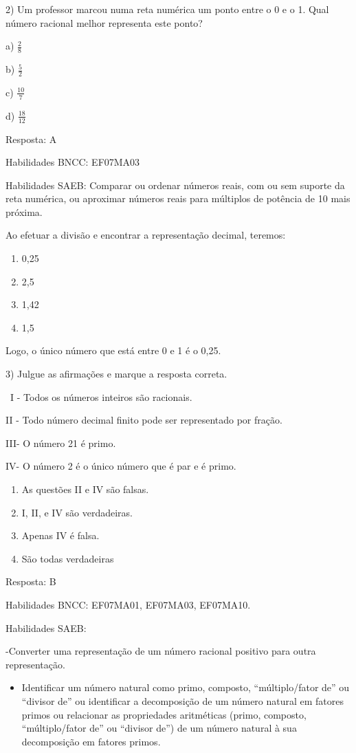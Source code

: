 2) Um professor marcou numa reta numérica um ponto entre o 0 e o 1. Qual
número racional melhor representa este ponto?

a) \(\frac{2}{8}\)

b) \(\frac{5}{2}\)

c) \(\frac{10}{7}\)

d) \(\frac{18}{12}\)

Resposta: A

Habilidades BNCC: EF07MA03

Habilidades SAEB: Comparar ou ordenar números reais, com ou sem suporte
da reta numérica, ou aproximar números reais para múltiplos de potência
de 10 mais próxima.

Ao efetuar a divisão e encontrar a representação decimal, teremos:

\begin{enumerate}
\def\labelenumi{\alph{enumi})}
\item
  0,25
\item
  2,5
\item
  1,42
\item
  1,5
\end{enumerate}

Logo, o único número que está entre 0 e 1 é o 0,25.

3) Julgue as afirmações e marque a resposta correta.

~I - Todos os números inteiros são racionais.

II - Todo número decimal finito pode ser representado por fração.

III- O número 21 é primo.

IV- O número 2 é o único número que é par e é primo.

\begin{enumerate}
\def\labelenumi{\alph{enumi})}
\item
  As questões II e IV são falsas.
\item
  I, II, e IV são verdadeiras.
\item
  Apenas IV é falsa.
\item
  São todas verdadeiras
\end{enumerate}

Resposta: B

Habilidades BNCC: EF07MA01, EF07MA03, EF07MA10.

Habilidades SAEB:

-Converter uma representação de um número racional positivo para outra
representação.

\begin{itemize}
\tightlist
\item
  Identificar um número natural como primo, composto, ``múltiplo/fator
  de'' ou ``divisor de'' ou identificar a decomposição de um número
  natural em fatores primos ou relacionar as propriedades aritméticas
  (primo, composto, ``múltiplo/fator de'' ou ``divisor de'') de um
  número natural à sua decomposição em fatores primos.
\end{itemize}

